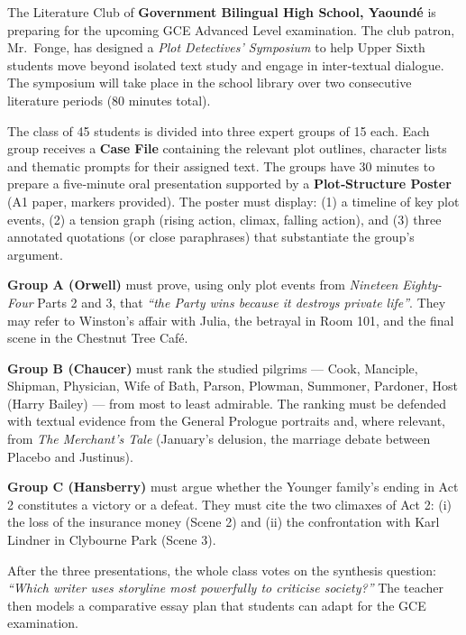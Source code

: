 \documentclass[11pt]{article}
\newcounter{popsec}
\newcounter{popsub}
\newcommand{\courssub}[1]{%
  \stepcounter{popsub}%
  \par\vspace{9pt}\noindent{\popxbold\fontsize{11.5}{13}\selectfont\color{popink}{\color{poporange}\thepopsec.\thepopsub}\hspace{6pt}#1}\par\nopagebreak\vspace{4pt}
}
\begin{document}
\courssub{Situation: The Plot Detectives' Symposium}
\begin{experience}
The Literature Club of \textbf{Government Bilingual High School, Yaound\'e} is preparing for the upcoming GCE Advanced Level examination. The club patron, Mr.~Fonge, has designed a \emph{Plot Detectives' Symposium} to help Upper Sixth students move beyond isolated text study and engage in inter‑textual dialogue. The symposium will take place in the school library over two consecutive literature periods (80 minutes total). 

The class of 45 students is divided into three expert groups of 15 each. Each group receives a \textbf{Case File} containing the relevant plot outlines, character lists and thematic prompts for their assigned text. The groups have 30 minutes to prepare a five‑minute oral presentation supported by a \textbf{Plot‑Structure Poster} (A1 paper, markers provided). The poster must display: (1) a timeline of key plot events, (2) a tension graph (rising action, climax, falling action), and (3) three annotated quotations (or close paraphrases) that substantiate the group's argument.

\textbf{Group A (Orwell)} must prove, using only plot events from \emph{Nineteen Eighty-Four} Parts 2 and 3, that \emph{``the Party wins because it destroys private life''}. They may refer to Winston's affair with Julia, the betrayal in Room 101, and the final scene in the Chestnut Tree Café.

\textbf{Group B (Chaucer)} must rank the studied pilgrims — Cook, Manciple, Shipman, Physician, Wife of Bath, Parson, Plowman, Summoner, Pardoner, Host (Harry Bailey) — from most to least admirable. The ranking must be defended with textual evidence from the General Prologue portraits and, where relevant, from \emph{The Merchant's Tale} (January's delusion, the marriage debate between Placebo and Justinus).

\textbf{Group C (Hansberry)} must argue whether the Younger family's ending in Act 2 constitutes a victory or a defeat. They must cite the two climaxes of Act 2: (i) the loss of the insurance money (Scene 2) and (ii) the confrontation with Karl Lindner in Clybourne Park (Scene 3).

After the three presentations, the whole class votes on the synthesis question: \emph{``Which writer uses storyline most powerfully to criticise society?''} The teacher then models a comparative essay plan that students can adapt for the GCE examination.
\end{experience}
\end{document}
